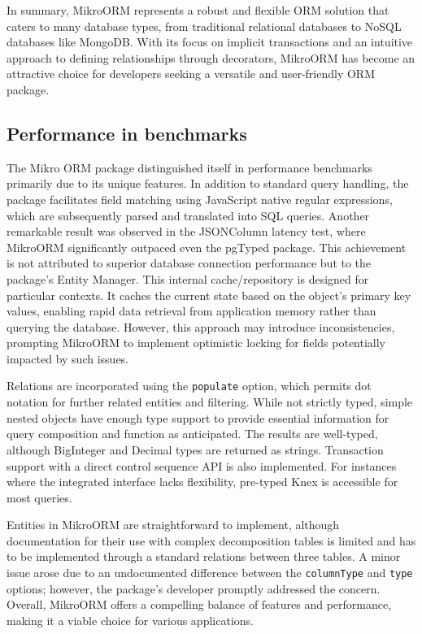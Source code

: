In summary, MikroORM represents a robust and flexible ORM solution that caters
to many database types, from traditional relational databases to NoSQL databases
like MongoDB. With its focus on implicit transactions and an intuitive approach
to defining relationships through decorators, MikroORM has become an attractive
choice for developers seeking a versatile and user-friendly ORM package.

\subsection*{Performance in benchmarks}

The Mikro ORM package distinguished itself in performance benchmarks primarily
due to its unique features. In addition to standard query handling, the package
facilitates field matching using JavaScript native regular expressions, which
are subsequently parsed and translated into SQL queries. Another remarkable
result was observed in the JSONColumn latency test, where MikroORM
significantly outpaced even the pgTyped package. This achievement is not
attributed to superior database connection performance but to the package's
Entity Manager. This internal cache/repository is designed for particular
contexts. It caches the current state based on the object's primary key values,
enabling rapid data retrieval from application memory rather than querying the
database. However, this approach may introduce inconsistencies, prompting
MikroORM to implement optimistic locking for fields potentially
impacted by such issues.

Relations are incorporated using the \texttt{populate} option, which permits dot
notation for further related entities and filtering. While not strictly typed,
simple nested objects have enough type support to provide essential information
for query composition and function as anticipated. The results are well-typed,
although BigInteger and Decimal types are returned as strings. Transaction
support with a direct control sequence API is also implemented. For instances
where the integrated interface lacks flexibility, pre-typed Knex is
accessible for most queries.

Entities in MikroORM are straightforward to implement, although documentation
for their use with complex decomposition tables is limited and has to be
implemented through a standard relations between three tables. A minor issue
arose due to an undocumented difference between the \texttt{columnType} and
\texttt{type} options; however, the package's developer promptly addressed the
concern. Overall, MikroORM offers a compelling balance of features and
performance, making it a viable choice for various applications.
